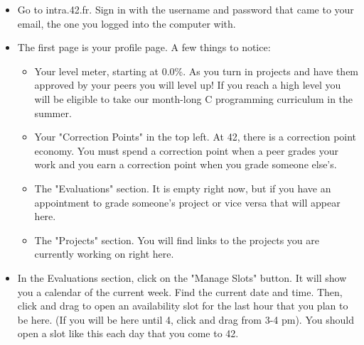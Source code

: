 \documentclass{42-en}
\begin{document}
\begin{itemize}

	\item Go to intra.42.fr. Sign in with the username and password that came to your email, the one you logged into the computer with.

	\item The first page is your profile page. A few things to notice:
	\begin{itemize}
		\item Your level meter, starting at 0.0\%. As you turn in projects and have them approved by your peers you will level up! If you reach a high level you will be eligible to take our month-long C programming curriculum in the summer.
		\item Your "Correction Points" in the top left. At 42, there is a correction point economy. You must spend a correction point when a peer grades your work and you earn a correction point when you grade someone else's.
		\item The "Evaluations" section. It is empty right now, but if you have an appointment to grade someone's project or vice versa that will appear here.
		\item The "Projects" section. You will find links to the projects you are currently working on right here.
	\end{itemize}

	\item In the Evaluations section, click on the "Manage Slots" button. It will show you a calendar of the current week. Find the current date and time. Then, click and drag to open an availability slot for the last hour that you plan to be here. (If you will be here until 4, click and drag from 3-4 pm). You should open a slot like this each day that you come to 42.


\end{itemize}
\end{document}
